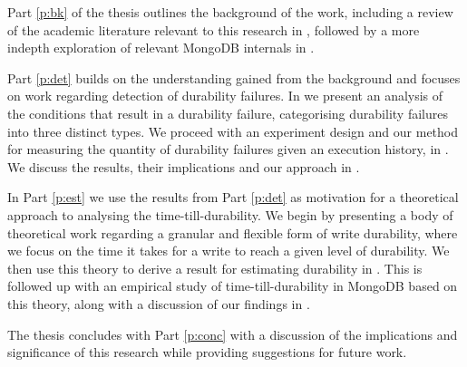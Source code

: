 Part \ref{p:bk} of the thesis outlines the background of the work, including a review of the academic literature relevant to this research in , followed by a more indepth exploration of relevant MongoDB internals in .

Part \ref{p:det} builds on the understanding gained from the background and focuses on work regarding detection of durability failures. In  we present an analysis of the conditions that result in a durability failure, categorising durability failures into three distinct types. We proceed with an experiment design and our method for measuring the quantity of durability failures given an execution history, in . We discuss the results, their implications and our approach in .

In Part \ref{p:est} we use the results from Part \ref{p:det} as motivation for a theoretical approach to analysing the time-till-durability. We begin by presenting a body of theoretical work regarding a granular and flexible form of write durability, where we focus on the time it takes for a write to reach a given level of durability. We then use this theory to derive a result for estimating durability in . This is followed up with an empirical study of time-till-durability in MongoDB based on this theory, along with a discussion of our findings in .

The thesis concludes with Part \ref{p:conc} with a discussion of the implications and significance of this research while providing suggestions for future work.